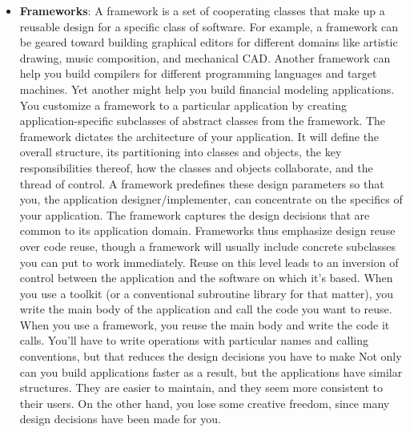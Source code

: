 \documentclass{report}
\begin{document}
\begin{itemize}
            \bigbreak \noindent 
            Toolkit design is arguably harder than application design, because toolkits have to work in many applications to be useful. Moreover, the toolkit writer isn't in a position to know what those applications will be or their special needs.
            \bigbreak \noindent 
            That makes it all the more important to avoid assumptions and dependencies that can limit the toolkit's flexibility and consequently its applicability and effectiveness
        \item \textbf{Frameworks}: A framework is a set of cooperating classes that make up a reusable design for a specific class of software. For example, a framework can be geared toward building graphical editors for different domains like artistic drawing, music composition, and mechanical CAD. Another framework can help you build compilers for different programming languages and target machines. Yet another might help you build financial modeling applications. You customize a framework to a particular application by creating application-specific subclasses of abstract classes from the framework.
            \bigbreak \noindent 
            The framework dictates the architecture of your application. It will define the overall structure, its partitioning into classes and objects, the key responsibilities thereof, how the classes and objects collaborate, and the thread of control. A framework predefines these design parameters so that you, the application designer/implementer, can concentrate on the specifics of your application. The framework captures the design decisions that are common to its application domain. Frameworks thus emphasize design reuse over code reuse, though a framework will usually include concrete subclasses you can put to work immediately.
            \bigbreak \noindent 
            Reuse on this level leads to an inversion of control between the application and the software on which it's based. When you use a toolkit (or a conventional subroutine library for that matter), you write the main body of the application and call the code you want to reuse. When you use a framework, you reuse the main body and write the code it calls. You'll have to write operations with particular names and calling conventions, but that reduces the design decisions you have to make
            \bigbreak \noindent 
            Not only can you build applications faster as a result, but the applications have similar structures. They are easier to maintain, and they seem more consistent to their users. On the other hand, you lose some creative freedom, since many design decisions have been made for you.

\end{itemize}
\end{document}
